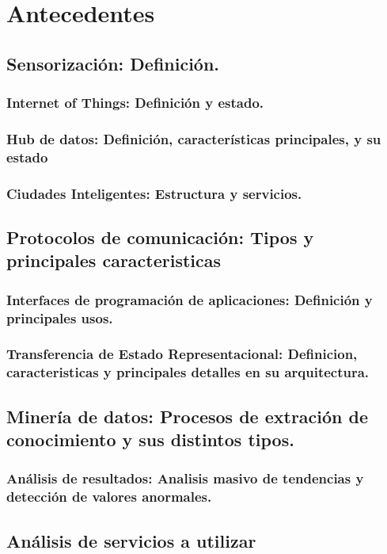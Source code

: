 \chapter{Antecedentes}
\label{chap:antecedentes}

\section{Sensorización: Definición.}
\subsection{Internet of Things: Definición y estado. }
\subsection{Hub de datos: Definición, características principales, y su estado}
\subsection{Ciudades Inteligentes: Estructura y servicios.}
\section{Protocolos de comunicación: Tipos y principales caracteristicas}
\subsection{Interfaces de programación de aplicaciones: Definición y principales usos.}
\subsection{Transferencia de Estado Representacional: Definicion, caracteristicas y 
  principales detalles en su arquitectura.}
\section{Minería de datos: Procesos de extración de conocimiento y sus distintos tipos.}
\subsection{Análisis de resultados: Analisis masivo de tendencias y detección de valores  anormales.}
\section{Análisis de servicios a utilizar}

